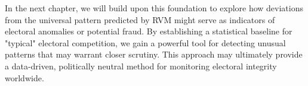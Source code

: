 In the next chapter, we will build upon this foundation to explore how deviations from the universal pattern predicted by RVM might serve as indicators of electoral anomalies or potential fraud. By establishing a statistical baseline for "typical" electoral competition, we gain a powerful tool for detecting unusual patterns that may warrant closer scrutiny. This approach may ultimately provide a data-driven, politically neutral method for monitoring electoral integrity worldwide.